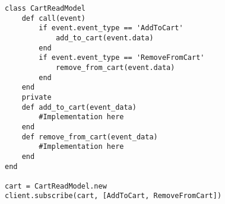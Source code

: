 \begin{lstlisting}[caption=``EventStore'' bibliotekos prenumeratorių mechanizmo panaudojimas, label=event_store_subscription]
class CartReadModel
    def call(event)
        if event.event_type == 'AddToCart'
            add_to_cart(event.data)
        end
        if event.event_type == 'RemoveFromCart'
            remove_from_cart(event.data)
        end
    end
    private
    def add_to_cart(event_data)
        #Implementation here
    end
    def remove_from_cart(event_data)
        #Implementation here
    end 
end
 
cart = CartReadModel.new
client.subscribe(cart, [AddToCart, RemoveFromCart]) 
\end{lstlisting}








